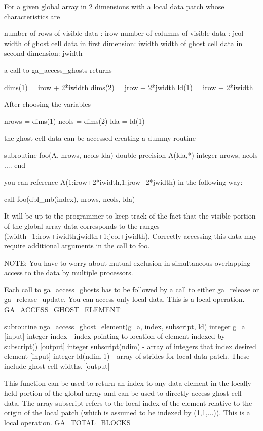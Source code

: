For a given global array in 2 dimensions with a local data patch whose
characteristics are

number of rows of visible data : irow number of columns of visible
data : jcol width of ghost cell data in first dimension: iwidth width
of ghost cell data in second dimension: jwidth

a call to ga\_access\_ghosts returns

dims(1) = irow + 2{*}iwidth dims(2) = jrow + 2{*}jwidth ld(1) = irow
+ 2{*}iwidth

After choosing the variables

nrows = dims(1) ncols = dims(2) lda = ld(1)

the ghost cell data can be accessed creating a dummy routine

subroutine foo(A, nrows, ncols lda) double precision A(lda,{*}) integer
nrows, ncols .... end

you can reference A(1:irow+2{*}iwidth,1:jrow+2{*}jwidth) in the following
way:

call foo(dbl\_mb(index), nrows, ncols, lda)

It will be up to the programmer to keep track of the fact that the
visible portion of the global array data corresponds to the ranges
(iwidth+1:irow+iwidth,jwidth+1:jcol+jwidth). Correctly accessing this
data may require additional arguments in the call to foo.

NOTE: You have to worry about mutual exclusion in simultaneous overlapping
access to the data by multiple processors.

Each call to ga\_access\_ghosts has to be followed by a call to either
ga\_release or ga\_release\_update. You can access only local data.
This is a local operation. GA\_ACCESS\_GHOST\_ELEMENT

subroutine nga\_access\_ghost\_element(g\_a, index, subscript, ld)
integer g\_a {[}input{]} integer index - index pointing to location
of element indexed by subscript() {[}output{]} integer subscript(ndim)
- array of integers that index desired element {[}input{]} integer
ld(ndim-1) - array of strides for local data patch. These include
ghost cell widths. {[}output{]}

This function can be used to return an index to any data element in
the locally held portion of the global array and can be used to directly
access ghost cell data. The array subscript refers to the local index
of the element relative to the origin of the local patch (which is
assumed to be indexed by (1,1,...)). This is a local operation. GA\_TOTAL\_BLOCKS

